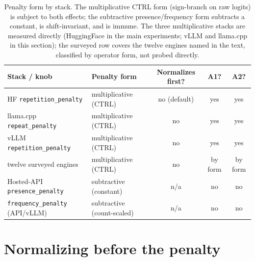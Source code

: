 \documentclass[11pt]{article}
\newcommand{\code}[1]{\texttt{#1}}
\begin{document}
\begin{table}[t]
\centering
\caption{Penalty form by stack. The multiplicative CTRL form (sign-branch on raw logits) is subject
to both effects; the subtractive presence/frequency form subtracts a constant, is
shift-invariant, and is immune. The three multiplicative stacks are measured directly (HuggingFace
in the main experiments; vLLM and llama.cpp in this section); the surveyed row covers the twelve
engines named in the text, classified by operator form, not probed directly.}
\label{tab:stacks}
\setlength{\tabcolsep}{3.5pt}\small
\begin{tabular}{llccc}
\toprule
Stack / knob & Penalty form & Normalizes first? & A1? & A2? \\
\midrule
HF \code{repetition\_penalty}        & multiplicative (CTRL) & no (default) & yes & yes \\
llama.cpp \code{repeat\_penalty}     & multiplicative (CTRL) & no & yes & yes \\
vLLM \code{repetition\_penalty}      & multiplicative (CTRL) & no & yes & yes \\
twelve surveyed engines              & multiplicative (CTRL) & no & by form & by form \\
Hosted-API \code{presence\_penalty}  & subtractive (constant) & n/a & no & no \\
\code{frequency\_penalty} (API/vLLM) & subtractive (count-scaled) & n/a & no & no \\
\bottomrule
\end{tabular}
\end{table}

\section{Normalizing before the penalty}\label{sec:fix}
\end{document}
